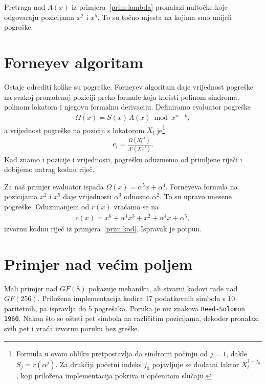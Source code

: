 \documentclass{mathos}
\begin{document}
\begin{primjer}\label{prim:chien}
Pretraga nad $\Lambda(x)$ iz primjera~\ref{prim:lambda} pronalazi nultočke koje odgovaraju pozicijama $x^2$ i $x^5$. To su točno mjesta na kojima smo unijeli pogreške.
\end{primjer}

\section{Forneyev algoritam}

Ostaje odrediti kolike su pogreške. Forneyev algoritam daje vrijednost pogreške na svakoj pronađenoj poziciji preko formule koja koristi polinom sindroma, polinom lokatora i njegovu formalnu derivaciju. Definiramo evaluator pogreške
\begin{align*}
    \Omega(x) = S(x)\, \Lambda(x) \bmod x^{n-k},
\end{align*}
a vrijednost pogreške na poziciji s lokatorom $X_l$ je\footnote{Formula u ovom obliku pretpostavlja da sindromi počinju od $j=1$, dakle $S_j = r(\alpha^j)$. Za drukčiji početni indeks $j_0$ pojavljuje se dodatni faktor $X_l^{1-j_0}$, koji priložena implementacija pokriva u općenitom slučaju.}
\begin{align*}
    e_l = \frac{\Omega(X_l^{-1})}{\Lambda'(X_l^{-1})}.
\end{align*}
Kad znamo i pozicije i vrijednosti, pogrešku oduzmemo od primljene riječi i dobijemo natrag kodnu riječ.

\begin{primjer}\label{prim:forney}
Za naš primjer evaluator ispada $\Omega(x) = \alpha^5 x + \alpha^4$. Forneyeva formula na pozicijama $x^2$ i $x^5$ daje vrijednosti $\alpha^3$ odnosno $\alpha^2$. To su upravo unesene pogreške. Oduzimanjem od $r(x)$ vraćamo se na
\begin{align*}
    c(x) = x^6 + \alpha^4 x^3 + x^2 + \alpha^4 x + \alpha^5,
\end{align*}
izvornu kodnu riječ iz primjera~\ref{prim:kod}. Ispravak je potpun.
\end{primjer}

\section{Primjer nad većim poljem}

Mali primjer nad $GF(8)$ pokazuje mehaniku, ali stvarni kodovi rade nad $GF(256)$. Priložena implementacija kodira 17 podatkovnih simbola s 10 paritetnih, pa ispravlja do 5 pogrešaka. Poruka je niz znakova \verb|Reed-Solomon 1960|. Nakon što se ošteti pet simbola na različitim pozicijama, dekoder pronalazi svih pet i vraća izvornu poruku bez greške.
\end{document}
